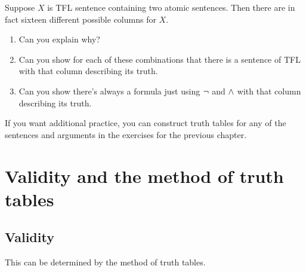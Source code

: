 \begin{practiceproblems}
\begin{enumerate}
\end{enumerate}
\problempart
Suppose $X$ is TFL sentence containing two atomic sentences. Then there are in fact sixteen different possible columns for $X$.
\begin{enumerate}
	\item Can you explain why?
	\item Can you show for each of these combinations that there is a sentence of TFL with that column describing its truth.
	\item {} Can you show there's always a formula just using $\neg$ and $\mathbin{\wedge}$ with that column describing its truth.
\end{enumerate}

If you want additional practice, you can construct truth tables for any of the sentences and arguments in the exercises for the previous chapter.

\end{practiceproblems}

\chapter{Validity and the method of truth tables}
\section{Validity}





This can be determined by the method of truth tables.

